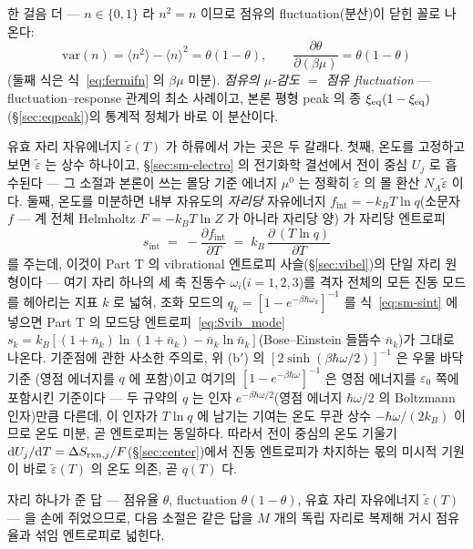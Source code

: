 한 걸음 더 --- $n\in\{0,1\}$ 라 $n^2=n$ 이므로 점유의 fluctuation(분산)이 닫힌 꼴로 나온다:
\begin{equation}
\mathrm{var}(n)=\langle n^2\rangle-\langle n\rangle^2=\theta(1-\theta),
\qquad
\frac{\partial\theta}{\partial(\beta\mu)}=\theta(1-\theta)
\label{eq:sm-flucres}
\end{equation}
(둘째 식은 식~\eqref{eq:fermifn} 의 $\beta\mu$ 미분). \emph{점유의 $\mu$-감도 $=$ 점유 fluctuation} --- fluctuation--response 관계의 최소 사례이고, 본론 평형 peak 의 종 $\xi_{\mathrm{eq}}(1-\xi_{\mathrm{eq}})$(\S\ref{sec:eqpeak})의
통계적 정체가 바로 이 분산이다.

유효 자리 자유에너지 $\tilde\varepsilon(T)$ 가 하류에서 가는 곳은 두 갈래다. 첫째, 온도를 고정하고 보면
$\tilde\varepsilon$ 는 상수 하나이고, \S\ref{sec:sm-electro} 의 전기화학 결선에서 전이 중심 $U_j$ 로
흡수된다 --- 그 소절과 본론이 쓰는 몰당 기준 에너지 $\mu^0$ 는 정확히 $\tilde\varepsilon$ 의 몰 환산
$N_A\tilde\varepsilon$ 이다. 둘째, 온도를 미분하면 내부 자유도의 \emph{자리당} 자유에너지
$f_\mathrm{int}=-k_BT\ln q$(소문자 $f$ --- 계 전체 Helmholtz $F{=}-k_BT\ln Z$ 가 아니라 자리당 양) 가 자리당 엔트로피
\begin{equation}
s_\mathrm{int}\;=\;-\frac{\partial f_\mathrm{int}}{\partial T}
\;=\;k_B\,\frac{\partial\,(T\ln q)}{\partial T}
\label{eq:sm-sint}
\end{equation}
를 주는데, 이것이 Part T 의 vibrational 엔트로피 사슬(\S\ref{sec:vibel})의 단일 자리 원형이다 --- 여기 자리 하나의
세 축 진동수 $\omega_i$($i=1,2,3$)를 격자 전체의 모든 진동 모드를 헤아리는 지표 $k$ 로 넓혀, 조화 모드의
$q_k=[1-e^{-\beta\hbar\omega_k}]^{-1}$ 를 식~\eqref{eq:sm-sint} 에 넣으면 Part T 의 모드당 엔트로피~\eqref{eq:Svib_mode}
$s_k=k_B[(1+\bar n_k)\ln(1+\bar n_k)-\bar n_k\ln\bar n_k]$(Bose--Einstein 들뜸수 $\bar n_k$)가 그대로
나온다. 기준점에 관한 사소한 주의로, 위 (b$'$) 의 $[2\sinh(\beta\hbar\omega/2)]^{-1}$ 은 우물 바닥 기준
(영점 에너지를 $q$ 에 포함)이고 여기의 $[1-e^{-\beta\hbar\omega}]^{-1}$ 은 영점 에너지를
$\varepsilon_0$ 쪽에 포함시킨 기준이다 --- 두 규약의 $q$ 는 인자 $e^{-\beta\hbar\omega/2}$(영점 에너지
$\hbar\omega/2$ 의 Boltzmann 인자)만큼 다른데, 이 인자가 $T\ln q$ 에 남기는 기여는 온도 무관 상수
$-\hbar\omega/(2k_B)$ 이므로 온도 미분, 곧 엔트로피는 동일하다. 따라서 전이 중심의 온도 기울기
$\mathrm{d} U_j/\mathrm{d} T=\Delta S_{\mathrm{rxn},j}/F$(\S\ref{sec:center})에서 진동
엔트로피가 차지하는 몫의 미시적 기원이 바로 $\tilde\varepsilon(T)$ 의 온도 의존, 곧 $q(T)$ 다.

자리 하나가 준 답 --- 점유율 $\theta$, fluctuation $\theta(1-\theta)$, 유효 자리 자유에너지
$\tilde\varepsilon(T)$ --- 을 손에 쥐었으므로, 다음 소절은 같은 답을 $M$ 개의 독립 자리로 복제해 거시
점유율과 섞임 엔트로피로 넓힌다.

